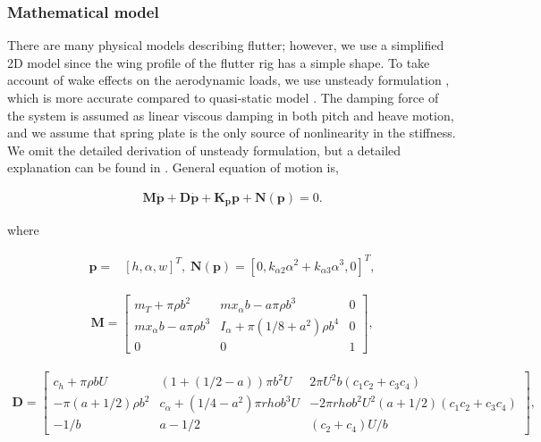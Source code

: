 \documentclass[openacc]{rsproca_new}%
\def\vec#1{\ensuremath{\mathbf{#1}}}
\begin{document}
\subsubsection{Mathematical model}\label{Math_model}
There are many physical models describing flutter; however, we use a simplified 2D model since the wing profile of the flutter rig has a simple shape. To take account of wake effects on the aerodynamic loads, we use unsteady formulation \cite{abdelkefi2013analytical}, which is more accurate compared to quasi-static model \cite{strganac2000identification}. The damping force of the system is assumed as linear viscous damping in both pitch and heave motion, and we assume that spring plate is the only source of nonlinearity in the stiffness. We omit the detailed derivation of unsteady formulation, but a detailed explanation can be found in \cite{abdelkefi2013analytical}. General equation of motion is,

\begin{align}\label{eq:2-1}
\vec{M} \ddot{\vec{p}} + \vec{D} \dot{\vec{p}} +\vec{K_p} \vec{p} + \vec{N}(\vec{p}) =0.
\end{align}

\noindent where

\begin{align}\label{eq:2-2}
\vec{p}=&[h,\alpha,w]^T, \; \vec{N}(\vec{p})=[0,k_{\alpha 2}\alpha^2+k_{\alpha 3}\alpha^3,0]^T,
\end{align}

\begin{align}\label{eq:2-3}
\vec{M}=
\begin{bmatrix}
    m_T+\pi \rho b^2       & m x_\alpha b-a\pi\rho b^3 & 0 \\
    m x_\alpha b-a\pi\rho b^3       & I_\alpha+\pi(1/8+a^2)\rho b^4 & 0 \\
    0       & 0 & 1
\end{bmatrix},
\end{align}

\begin{align}\label{eq:2-4}
\vec D=
\begin{bmatrix}
      c_h+\pi \rho b U        & (1+(1/2-a))\pi b^2 U & 2 \pi U^2 b (c_1c_2+c_3c_4) \\
      -\pi (a+1/2)\rho b^2        & c_\alpha+(1/4-a^2)\pi rho b^3 U & -2 \pi rho b^2 U^2 (a+1/2)(c_1c_2+c_3c_4) \\
      -1/b       & a-1/2 & (c_2+c_4)U/b
\end{bmatrix},
\end{align}
\end{document}
